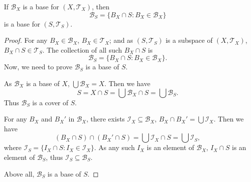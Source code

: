 \begin{proposition}
	If $\mathcal B_X$ is a base for $(X, \mathcal T_X)$, then
	$$
	\mathcal B_S = \{ B_X \cap S : B_X \in \mathcal B_X \}
	$$
	is a base for $(S, \mathcal T_S)$.
	
	\begin{proof}
		For any $B_X \in \mathcal B_X$, $B_X \in \mathcal T_X$; and as $(S, \mathcal T_S)$ is a subspace of $(X, \mathcal T_X)$, $B_X \cap S \in \mathcal T_S$. The collection of all such $B_X \cap S$ is
		$$
		\mathcal B_S = \{ B_X \cap S : B_X \in \mathcal B_X \}.
		$$
		Now, we need to prove $\mathcal B_S$ is a base of $S$.
		
		As $\mathcal B_X$ is a base of $X$, $\bigcup \mathcal B_X = X$. Then we have
		$$
		S = X \cap S = \bigcup \mathcal B_X \cap S = \bigcup \mathcal B_S.
		$$
		Thus $\mathcal B_S$ is a cover of $S$.
		
		For any $B_X$ and $B_X'$ in $\mathcal B_X$, there exists $\mathcal I_X \subseteq \mathcal B_X$, $B_X \cap B_X' = \bigcup \mathcal I_X$. Then we have
		$$
		(B_X \cap S) \cap (B_X' \cap S) = \bigcup \mathcal I_X \cap S = \bigcup \mathcal I_S,
		$$
		where $\mathcal I_S = \{ I_X \cap S : I_X \in \mathcal I_X \}$. As any such $I_X$ is an element of $\mathcal B_X$, $I_X \cap S$ is an element of $\mathcal B_S$, thus $\mathcal I_S \subseteq \mathcal B_S$.
		
		Above all, $\mathcal B_S$ is a base of $S$.
	\end{proof}
\end{proposition}






































